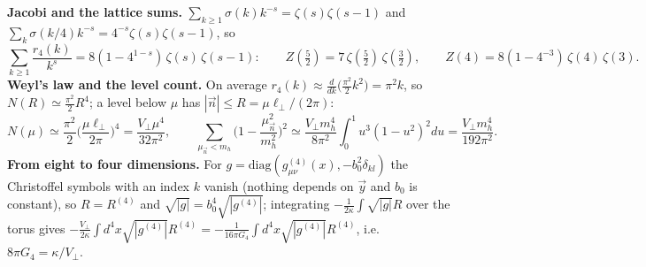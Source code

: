 \documentclass[10pt,a4paper]{article}
\begin{document}
\textbf{Jacobi and the lattice sums.} $\sum_{k\ge1}\sigma(k)k^{-s}=\zeta(s)\zeta(s-1)$ and $\sum_k\sigma(k/4)k^{-s}=4^{-s}\zeta(s)\zeta(s-1)$, so
\begin{equation*}
\sum_{k\ge1}\frac{r_4(k)}{k^s}=8(1-4^{1-s})\,\zeta(s)\,\zeta(s-1):\qquad Z(\tfrac52)=7\,\zeta(\tfrac52)\,\zeta(\tfrac32),\qquad Z(4)=8(1-4^{-3})\,\zeta(4)\,\zeta(3).
\end{equation*}
\textbf{Weyl’s law and the level count.} On average $r_4(k)\approx\frac{d}{dk}\big(\frac{\pi^2}2k^2\big)=\pi^2k$, so $N(R)\simeq\frac{\pi^2}2R^4$; a level below $\mu$ has $|\vec n|\le R=\mu\ell_\perp/(2\pi)$:
\begin{equation*}
N(\mu)\simeq\frac{\pi^2}2\Big(\frac{\mu\ell_\perp}{2\pi}\Big)^4=\frac{V_\perp\mu^4}{32\pi^2},\qquad \sum_{\mu_{\vec n}<m_h}\Big(1-\frac{\mu_{\vec n}^2}{m_h^2}\Big)^2\simeq\frac{V_\perp m_h^4}{8\pi^2}\int_0^1u^3(1-u^2)^2du=\frac{V_\perp m_h^4}{192\pi^2}.
\end{equation*}
\textbf{From eight to four dimensions.} For $g=\mathrm{diag}(g^{(4)}_{\mu\nu}(x),-b_0^2\delta_{kl})$ the Christoffel symbols with an index $k$ vanish (nothing depends on $\vec y$ and $b_0$ is constant), so $R=R^{(4)}$ and $\sqrt{|g|}=b_0^4\sqrt{|g^{(4)}|}$; integrating $-\frac1{2\kappa}\int\sqrt{|g|}R$ over the torus gives $-\frac{V_\perp}{2\kappa}\int d^4x\sqrt{|g^{(4)}|}R^{(4)}=-\frac1{16\pi G_4}\int d^4x\sqrt{|g^{(4)}|}R^{(4)}$, i.e. $8\pi G_4=\kappa/V_\perp$.
\end{document}
